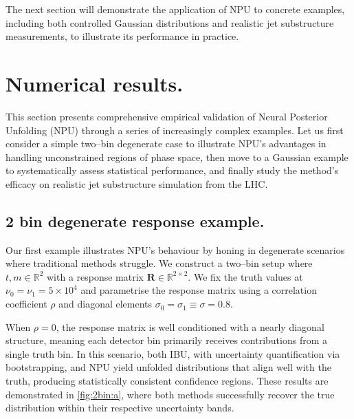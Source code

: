     The next section will demonstrate the application of NPU to concrete examples, including both controlled Gaussian distributions and realistic jet substructure measurements, to illustrate its performance in practice.
\section{Numerical results.}
    This section presents comprehensive empirical validation of Neural Posterior Unfolding (NPU) through a series of increasingly complex examples.
    Let us first consider a simple two--bin degenerate case to illustrate NPU's advantages in handling unconstrained regions of phase space, then move to a Gaussian example to systematically assess statistical performance, and finally study the method's efficacy on realistic jet substructure simulation from the LHC.
    \subsection{2 bin degenerate response example.}
        Our first example illustrates NPU's behaviour by honing in degenerate scenarios where traditional methods struggle.
        We construct a two--bin setup where $t, m \in \mathbb{R}^2$ with a response matrix $\mathbf{R} \in \mathbb{R}^{2 \times 2}$.
        We fix the truth values at $\nu_0 = \nu_1 = 5 \times 10^4$ and parametrise the response matrix using a correlation coefficient $\rho$ and diagonal elements $\sigma_0 = \sigma_1 \equiv \sigma = 0.8$.

When $\rho = 0$, the response matrix is well conditioned with a nearly diagonal structure, meaning each detector bin primarily receives contributions from a single truth bin.
%
In this scenario, both IBU, with uncertainty quantification via bootstrapping, and NPU yield unfolded distributions that align well with the truth, producing statistically consistent confidence regions.
%
These results are demonstrated in \cref{fig:2bin:a}, where both methods successfully recover the true distribution within their respective uncertainty bands.

